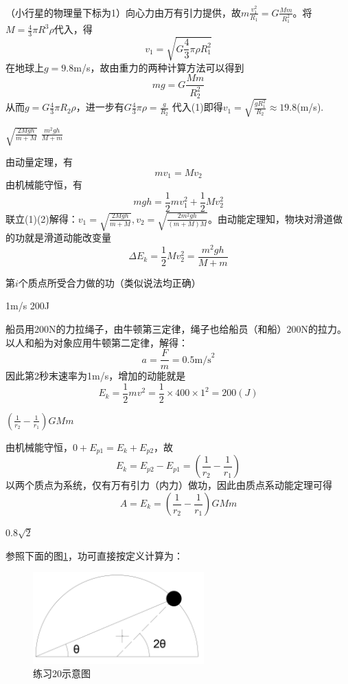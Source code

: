 \documentclass[b5paper,opensource,sourcefont,parskip]{qyxf-book}
\begin{document}
\solve
（小行星的物理量下标为1）向心力由万有引力提供，故$m\frac{v_1^2}{R_1}=G\frac{Mm}{R_1^2}$。将$M=\frac{4}{3}\pi R^3\rho$代入，得
\[v_1=\sqrt{G\frac{4}{3}\pi\rho R_1^2}\]
在地球上$g=9.8$m/s，故由重力的两种计算方法可以得到
\[mg=G\frac{Mm}{R_2^2}\]
从而$g=G\frac{4}{3}\pi R_2\rho$，进一步有$G\frac{4}{3}\pi\rho=\frac{g}{R_2}$
代入(1)即得$v_1=\sqrt{\frac{gR_1^2}{R_2}}\approx19.8$(m/s).

 $\sqrt{\frac{2Mgh}{m+M}}$ \qquad $\frac{m^2gh}{M+m}$

\solve 由动量定理，有
\begin{equation}
mv_1=Mv_2
\end{equation}
由机械能守恒，有
\begin{equation}
mgh=\frac{1}{2}mv_1^2+\frac{1}{2}Mv_2^2
\end{equation}
联立(1)(2)解得：$v_1=\sqrt{\frac{2Mgh}{m+M}}
,v_2=\sqrt{\frac{2m^2gh}{(m+M)M}}$。由动能定理知，物块对滑道做的功就是滑道动能改变量
\[\Delta E_k=\frac{1}{2}Mv_2^2=\frac{m^2gh}{M+m}\]

 第$i$个质点所受合力做的功（类似说法均正确）

1m/s \qquad 200J

\solve 船员用$200$N的力拉绳子，由牛顿第三定律，绳子也给船员（和船）$200$N的拉力。以人和船为对象应用牛顿第二定律，解得：
\[a=\frac{F}{m}=0.5\text{m/s}^2\]
因此第2秒末速率为1m/s，增加的动能就是
\[E_k=\frac{1}{2}mv^2=\frac{1}{2}\times400\times1^2=200(J)\]

$\left(\frac{1}{r_2}-\frac{1}{r_1}\right)GMm$ 

\solve 由机械能守恒，$0+E_{p1}=E_k+E_{p2}$，故
\[E_k=E_{p2}-E_{p1}=\left(\frac{1}{r_2}-\frac{1}{r_1}\right)\]
以两个质点为系统，仅有万有引力（内力）做功，因此由质点系动能定理可得
\[A=E_k=\left(\frac{1}{r_2}-\frac{1}{r_1}\right)GMm\]

$0.8\sqrt{2}$

\solve 参照下面的图\ref{fig:t20}，功可直接按定义计算为：

\begin{figure}[htbp]
\centering
\includegraphics[height=100pt]{Chp2_illus1.png}
\caption{练习20示意图}\label{fig:t20}
\end{figure}
\end{document}
